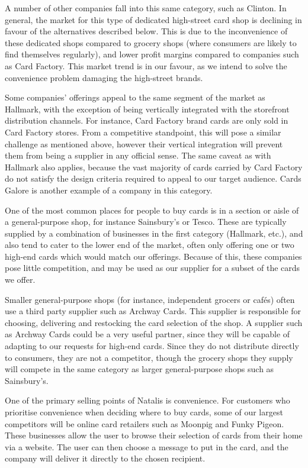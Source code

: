 \documentclass[10pt,a4paper]{article}
\begin{document}
A number of other companies fall into this same category, such as Clinton. In general, the market for this type of dedicated high-street card shop is declining in favour of the alternatives described below. This is due to the inconvenience of these dedicated shops compared to grocery shops (where consumers are likely to find themselves regularly), and lower profit margins compared to companies such as Card Factory. This market trend is in our favour, as we intend to solve the convenience problem damaging the high-street brands.

Some companies' offerings appeal to the same segment of the market as Hallmark, with the exception of being vertically integrated with the storefront distribution channels. For instance, Card Factory brand cards are only sold in Card Factory stores. From a competitive standpoint, this will pose a similar challenge as mentioned above, however their vertical integration will prevent them from being a supplier in any official sense. The same caveat as with Hallmark also applies, because the vast majority of cards carried by Card Factory do not satisfy the design criteria required to appeal to our target audience. Cards Galore is another example of a company in this category.

One of the most common places for people to buy cards is in a section or aisle of a general-purpose shop, for instance Sainsbury's or Tesco. These are typically supplied by a combination of businesses in the first category (Hallmark, etc.), and also tend to cater to the lower end of the market, often only offering one or two high-end cards which would match our offerings. Because of this, these companies pose little competition, and may be used as our supplier for a subset of the cards we offer.

Smaller general-purpose shops (for instance, independent grocers or caf\'es) often use a third party supplier such as Archway Cards. This supplier is responsible for choosing, delivering and restocking the card selection of the shop. A supplier such as Archway Cards could be a very useful partner, since they will be capable of adapting to our requests for high-end cards. Since they do not distribute directly to consumers, they are not a competitor, though the grocery shops they supply will compete in the same category as larger general-purpose shops such as Sainsbury's.


One of the primary selling points of Natalis is convenience. For customers who prioritise convenience when deciding where to buy cards, some of our largest competitors will be online card retailers such as Moonpig and Funky Pigeon. These businesses allow the user to browse their selection of cards from their home via a website. The user can then choose a message to put in the card, and the company will deliver it directly to the chosen recipient.
\end{document}
